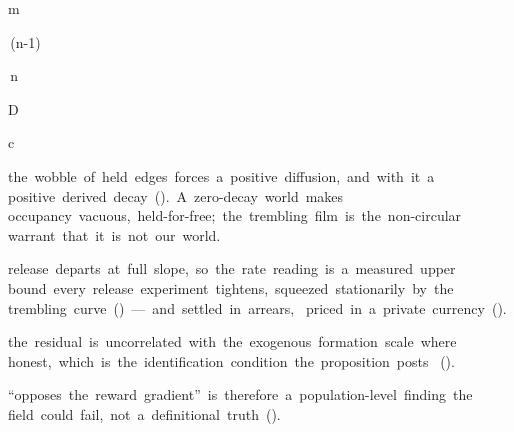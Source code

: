   { \varpi }

  { \phi\sb{\partial} }

  { m\sb{\phi} }

  {  }

  { \noisediff\,(n-1) }

  { \noisediff\,n }

  { \mu\sb{\kappa} }

  { D }

  { \mathbf c }

  { \pi{} }



  { the~wobble~of~held~edges~forces~a~positive~diffusion,~and~with~it~a~
    positive~derived~decay~().~A~zero-decay~world~makes~
    occupancy~vacuous,~held-for-free;~the~trembling~film~is~the~non-circular~
    warrant~that~it~is~not~our~world. }

  { release~departs~at~full~slope,~so~the~rate~reading~is~a~measured~upper~
    bound~every~release~experiment~tightens,~squeezed~stationarily~by~the~
    trembling~curve~()~---~and~settled~in~arrears,~
    priced~in~a~private~currency~(). }

  { the~residual~is~uncorrelated~with~the~exogenous~formation~scale~where~
    honest,~which~is~the~identification~condition~the~proposition~posts~
    (). }

  { ``opposes~the~reward~gradient''~is~therefore~a~population-level~finding~the~
    field~could~fail,~not~a~definitional~truth~(). }

